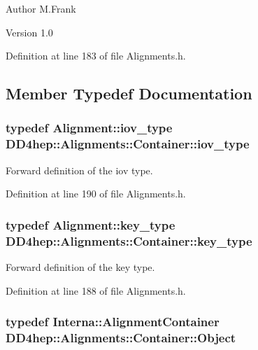 \begin{DoxyAuthor}{Author}
M.Frank 
\end{DoxyAuthor}
\begin{DoxyVersion}{Version}
1.0 
\end{DoxyVersion}


Definition at line 183 of file Alignments.h.

\subsection{Member Typedef Documentation}
\hypertarget{class_d_d4hep_1_1_alignments_1_1_container_a0da2fec1e4433deea86defda82886128}{
\subsubsection[{iov\_\-type}]{\setlength{\rightskip}{0pt plus 5cm}typedef {\bf Alignment::iov\_\-type} {\bf DD4hep::Alignments::Container::iov\_\-type}}}
\label{class_d_d4hep_1_1_alignments_1_1_container_a0da2fec1e4433deea86defda82886128}


Forward definition of the iov type. 

Definition at line 190 of file Alignments.h.\hypertarget{class_d_d4hep_1_1_alignments_1_1_container_a4101ffa946cedbaf996682533e57c44e}{
\subsubsection[{key\_\-type}]{\setlength{\rightskip}{0pt plus 5cm}typedef {\bf Alignment::key\_\-type} {\bf DD4hep::Alignments::Container::key\_\-type}}}
\label{class_d_d4hep_1_1_alignments_1_1_container_a4101ffa946cedbaf996682533e57c44e}


Forward definition of the key type. 

Definition at line 188 of file Alignments.h.\hypertarget{class_d_d4hep_1_1_alignments_1_1_container_aac463478e91949b594ffe837fd9bd9a8}{
\subsubsection[{Object}]{\setlength{\rightskip}{0pt plus 5cm}typedef {\bf Interna::AlignmentContainer} {\bf DD4hep::Alignments::Container::Object}}}
\label{class_d_d4hep_1_1_alignments_1_1_container_aac463478e91949b594ffe837fd9bd9a8}


